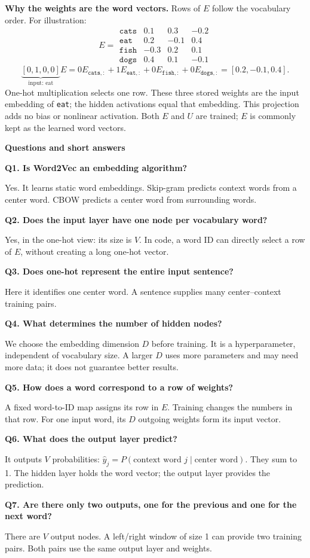\documentclass[11pt,a4paper]{article}
\newcommand{\qa}[2]{%
  \par\addvspace{8pt}\noindent\textbf{#1}\par\nobreak
  \noindent #2\par}
\newcommand{\pagetitle}[1]{%
  {\Large\sffamily\bfseries #1}\par\medskip}
\begin{document}
\medskip
\textbf{Why the weights are the word vectors.}
Rows of $E$ follow the vocabulary order. For illustration:
\[
E=
\begin{array}{c|rrr}
\texttt{cats}&0.1&0.3&-0.2\\
\texttt{eat}&0.2&-0.1&0.4\\
\texttt{fish}&-0.3&0.2&0.1\\
\texttt{dogs}&0.4&0.1&-0.1
\end{array}
\]
\[
\underbrace{[0,1,0,0]}_{\text{input: eat}}E
=0E_{\texttt{cats},:}+1E_{\texttt{eat},:}
 +0E_{\texttt{fish},:}+0E_{\texttt{dogs},:}
=[0.2,-0.1,0.4].
\]
One-hot multiplication selects one row. These three stored weights are the
input embedding of \texttt{eat}; the hidden activations equal that embedding.
This projection adds no bias or nonlinear activation.
Both $E$ and $U$ are trained; $E$ is commonly kept as the learned word vectors.

\clearpage
\pagetitle{Questions and short answers}

\qa{Q1. Is Word2Vec an embedding algorithm?}{
Yes. It learns static word embeddings.
Skip-gram predicts context words from a center word.
CBOW predicts a center word from surrounding words.}

\qa{Q2. Does the input layer have one node per vocabulary word?}{
Yes, in the one-hot view: its size is $V$.
In code, a word ID can directly select a row of $E$, without creating a long one-hot vector.}

\qa{Q3. Does one-hot represent the entire input sentence?}{
Here it identifies one center word.
A sentence supplies many center--context training pairs.}

\qa{Q4. What determines the number of hidden nodes?}{
We choose the embedding dimension $D$ before training.
It is a hyperparameter, independent of vocabulary size.
A larger $D$ uses more parameters and may need more data; it does not guarantee better results.}

\qa{Q5. How does a word correspond to a row of weights?}{
A fixed word-to-ID map assigns its row in $E$.
Training changes the numbers in that row.
For one input word, its $D$ outgoing weights form its input vector.}

\qa{Q6. What does the output layer predict?}{
It outputs $V$ probabilities: $\hat y_j=P(\text{context word }j\mid\text{center word})$.
They sum to 1.
The hidden layer holds the word vector; the output layer provides the prediction.}

\qa{Q7. Are there only two outputs, one for the previous and one for the next word?}{
There are $V$ output nodes.
A left/right window of size 1 can provide two training pairs.
Both pairs use the same output layer and weights.}
\end{document}
